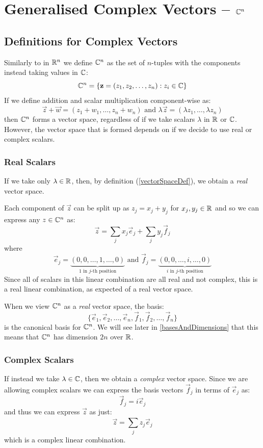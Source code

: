 \documentclass[../main.tex]{subfiles}
\begin{document}
\section{Generalised Complex Vectors\texorpdfstring{ -- $\mathbb{C}^{n}$}{}}
\subsection{Definitions for Complex Vectors}
Similarly to in $\mathbb{R}^{n}$ we define $\mathbb{C}^{n}$ as the set of $n$-tuples with the components instead taking values in $\mathbb{C}$:
\[
  \mathbb{C}^{n} = \{\mathbf{\bm{z}} = (z_1, z_2, \ldots, z_n): z_i \in \mathbb{C}\}
\]
If we define addition and scalar multiplication component-wise as:
\[
  \vec{z} + \vec{w} = (z_1 + w_1, \ldots, z_n + w_n) \text{ and } \lambda \vec{z} = (\lambda z_1, \ldots, \lambda z_n)
\]
then $\mathbb{C}^{n}$ forms a vector space, regardless of if we take scalars $\lambda$ in $\mathbb{R}$ or $\mathbb{C}$.
However, the vector space that is formed depends on if we decide to use real or complex scalars.
\subsubsection{Real Scalars}
If we take only $\lambda \in \mathbb{R}$, then, by definition (\cref{vectorSpaceDef}), we obtain a \textit{real} vector space.

Each component of $\vec{z}$ can be split up as $z_j = x_j + y_j$ for $x_j, y_j \in \mathbb{R}$ and so we can express any $z \in \mathbb{C}^{n}$ as:
\[
  \vec{z} = \sum_{j}^{} x_j \vec{e}_j + \sum_{j}^{} y_j \vec{f}_j
\]
where
\[
  \vec{e}_j = \underbrace{(0, 0, \ldots, 1, \ldots, 0)}_{\text{1 in $j$-th position}} \text{ and }
  \vec{f}_j = \underbrace{(0, 0, \ldots, i, \ldots, 0)}_{\text{$i$ in $j$-th position}}
\]
Since all of scalars in this linear combination are all real and not complex, this is a real linear combination, as expected of a real vector space.

When we view $\mathbb{C}^{n}$ as a \textit{real} vector space, the basis:
\[
  \{\vec{e}_1, \vec{e}_2, \ldots, \vec{e}_n, \vec{f}_1, \vec{f}_2, \ldots, \vec{f}_n\}
\]
is the canonical basis for $\mathbb{C}^{n}$.
We will see later in \cref{basesAndDimensions} that this means that $\mathbb{C}^{n}$ has dimension $2n$ over $\mathbb{R}$.
\subsubsection{Complex Scalars}
If instead we take $\lambda \in \mathbb{C}$, then we obtain a \textit{complex} vector space.
Since we are allowing complex scalars we can express the basis vectors $\vec{f}_j$ in terms of $\vec{e}_j$ as:
\[
  \vec{f}_j = i \vec{e}_j
\]
and thus we can express $\vec{z}$ as just:
\[
  \vec{z} = \sum_{j}^{} z_j \vec{e}_j
\]
which is a complex linear combination.
\end{document}
